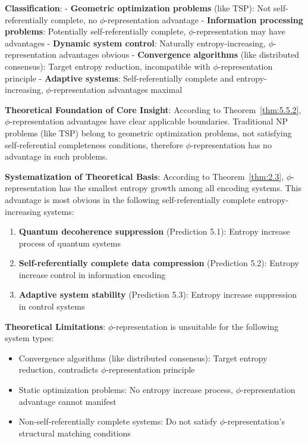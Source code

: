    \textbf{Classification}:
   - \textbf{Geometric optimization problems} (like TSP): Not self-referentially complete, no $\phi$-representation advantage
   - \textbf{Information processing problems}: Potentially self-referentially complete, $\phi$-representation may have advantages
   - \textbf{Dynamic system control}: Naturally entropy-increasing, $\phi$-representation advantages obvious
   - \textbf{Convergence algorithms} (like distributed consensus): Target entropy reduction, incompatible with $\phi$-representation principle
   - \textbf{Adaptive systems}: Self-referentially complete and entropy-increasing, $\phi$-representation advantages maximal

\textbf{Theoretical Foundation of Core Insight}:
According to Theorem~\ref{thm:5.5.2}, $\phi$-representation advantages have clear applicable boundaries. Traditional NP problems (like TSP) belong to geometric optimization problems, not satisfying self-referential completeness conditions, therefore $\phi$-representation has no advantage in such problems.

\textbf{Systematization of Theoretical Basis}:
According to Theorem~\ref{thm:2.3}, $\phi$-representation has the smallest entropy growth among all encoding systems. This advantage is most obvious in the following self-referentially complete entropy-increasing systems:

\begin{enumerate}
\item \textbf{Quantum decoherence suppression} (Prediction 5.1): Entropy increase process of quantum systems
\item \textbf{Self-referentially complete data compression} (Prediction 5.2): Entropy increase control in information encoding
\item \textbf{Adaptive system stability} (Prediction 5.3): Entropy increase suppression in control systems
\end{enumerate}

\textbf{Theoretical Limitations}:
$\phi$-representation is unsuitable for the following system types:
\begin{itemize}
\item Convergence algorithms (like distributed consensus): Target entropy reduction, contradicts $\phi$-representation principle
\item Static optimization problems: No entropy increase process, $\phi$-representation advantage cannot manifest
\item Non-self-referentially complete systems: Do not satisfy $\phi$-representation's structural matching conditions
\end{itemize}

